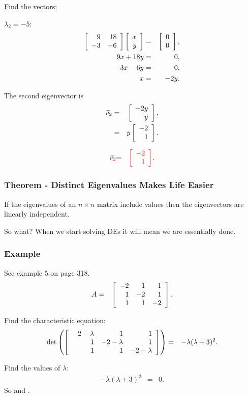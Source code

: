 \begin{frame}
  Find the vectors:

  $\lambda_2 = -5$:
  \begin{eqnarray*}
    \left[ \begin{array}{rr} 9 & 18 \\ -3 & -6 \end{array} \right] \left[ \begin{array}{r} x \\ y \end{array} \right] & = & \left[ \begin{array}{r} 0 \\ 0 \end{array} \right], \\
    9x + 18y & = & 0, \\
    -3x - 6y & = & 0, \\
    x & = & -2 y.
  \end{eqnarray*}

  The second eigenvector is 
  \begin{eqnarray*}
    \vec{v}_2 & = & \left[ \begin{array}{r} -2y \\ y \end{array} \right], \\
    & = & y \left[ \begin{array}{r} -2 \\ 1 \end{array} \right].
  \end{eqnarray*}

  \begin{eqnarray*}
    {\color{red}\vec{v}_2} & {\color{red}=} & {\color{red}\left[ \begin{array}{r} -2 \\ 1 \end{array} \right]}.
  \end{eqnarray*}

\end{frame}



\begin{frame}
  \frametitle{Theorem - Distinct Eigenvalues Makes Life Easier}

  \begin{theorem}
    If the eigenvalues of an $n\times n$ matrix include 
     values then the eigenvectors are linearly
    independent.
  \end{theorem}


  \vfill

  {
    So what? When we start solving DEs it will mean we are essentially
    done. 
  }

  \vfill

\end{frame}



\begin{frame}
  \frametitle{Example}

  See example 5 on page 318.
  \begin{eqnarray*}
    A & = & \left[ \begin{array}{rrr} -2 & 1 & 1 \\ 1 & -2 & 1 \\ 1 & 1 & -2 \end{array} \right].
  \end{eqnarray*}

  {
    Find the characteristic equation:
    \begin{eqnarray*}
      \det\left(\left[ \begin{array}{rrr} -2-\lambda & 1 & 1 \\ 1 & -2-\lambda & 1 \\ 1 & 1 & -2-\lambda \end{array} \right]\right)
      & = & -\lambda (\lambda+3)^2.
    \end{eqnarray*}

    Find the values of $\lambda$:
    \begin{eqnarray*}
      - \lambda (\lambda+3)^2 & = & 0.
    \end{eqnarray*}
    So  and .
  }

\end{frame}



